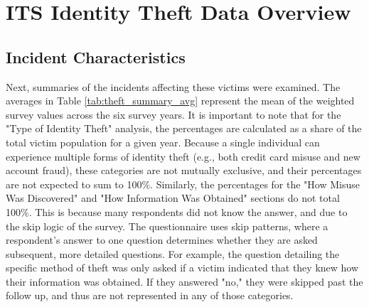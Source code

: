 \section{ITS Identity Theft Data Overview}
\label{app:demographics}


\subsection{Incident Characteristics}
\label{sec:incident_characteristics}

Next, summaries of the incidents affecting these victims were examined. The averages in Table \ref{tab:theft_summary_avg} represent the mean of the weighted survey values across the six survey years. It is important to note that for the "Type of Identity Theft" analysis, the percentages are calculated as a share of the total victim population for a given year. Because a single individual can experience multiple forms of identity theft (e.g., both credit card misuse and new account fraud), these categories are not mutually exclusive, and their percentages are not expected to sum to 100\%. Similarly, the percentages for the "How Misuse Was Discovered" and "How Information Was Obtained" sections do not total 100\%. This is because many respondents did not know the answer, and due to the skip logic of the survey. The questionnaire uses skip patterns, where a respondent's answer to one question determines whether they are asked subsequent, more detailed questions. For example, the question detailing the specific method of theft was only asked if a victim indicated that they knew how their information was obtained. If they answered "no," they were skipped past the follow up, and thus are not represented in any of those categories.

